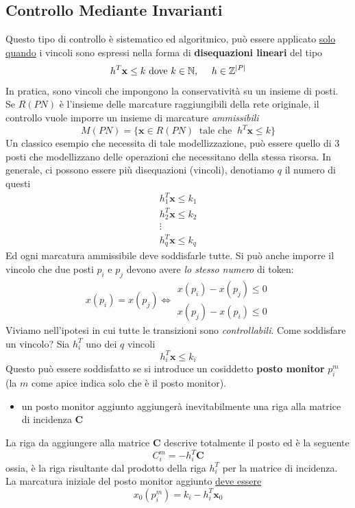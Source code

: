 \documentclass[10pt, letterpaper]{report}
\begin{document}
\subsection{Controllo Mediante Invarianti}
Questo tipo di controllo è sistematico ed algoritmico, può essere applicato \underline{solo quando} i vincoli sono espressi nella forma di \textbf{disequazioni lineari} del tipo 
$$ h^T\mathbf x \le k \text{ dove }k\in \N,  \ \ \ \ h\in \Z^{|P|}$$
In pratica, sono vincoli che impongono la conservatività su un insieme di posti. Se $R(PN)$ è l'insieme delle marcature raggiungibili della rete originale, il controllo vuole imporre un insieme di marcature \textit{ammissibili}
$$ M(PN)=\{\mathbf x \in R(PN) \  \text{ tale che } \ h^T\mathbf x \le k \}$$
Un classico esempio che necessita di tale modellizzazione, può essere quello di 3 posti che modellizzano delle operazioni che necessitano della stessa risorsa. In generale, ci possono essere più disequazioni (vincoli), denotiamo $q$ il numero di questi 
$$ \begin{matrix}
    h_1^T\mathbf x \le k_1\\ 
    h_2^T\mathbf x \le k_2\\ \vdots \\ 
    h_q^T\mathbf x \le k_q
\end{matrix}$$
Ed ogni marcatura ammissibile deve soddisfarle tutte.
Si può anche imporre il vincolo che due posti $p_i$ e $p_j$ devono avere \textit{lo stesso numero} di token:
$$x(p_i)=x(p_j)\iff \begin{matrix}
    x(p_i)-x(p_j) \le 0\\ 
    x(p_j)-x(p_i) \le 0
\end{matrix}$$
Viviamo nell'ipotesi in cui tutte le transizioni sono \textit{controllabili}. Come soddisfare un vincolo? Sia $h_i^T$ uno dei $q$ vincoli$$  h_i^T\mathbf x \le k_i$$
Questo può essere soddisfatto se si introduce un cosiddetto \textbf{posto monitor} $p_i^m$ (la $m$ come apice indica solo che è il posto monitor).\begin{itemize}
    \item un posto monitor aggiunto aggiungerà inevitabilmente una riga alla matrice di incidenza $\mathbf C$
\end{itemize}
La riga da aggiungere alla matrice $\mathbf C$ descrive totalmente il posto ed è la seguente 
$$ C_i^m=-h_i^T\mathbf C$$
ossia, è la riga risultante dal prodotto della riga $h_i^T$ per la matrice di incidenza. La marcatura iniziale del posto monitor aggiunto \underline{deve essere}
 $$ x_0(p_i^m)=k_{i}-h_{i}^T\mathbf x_0$$
\end{document}
